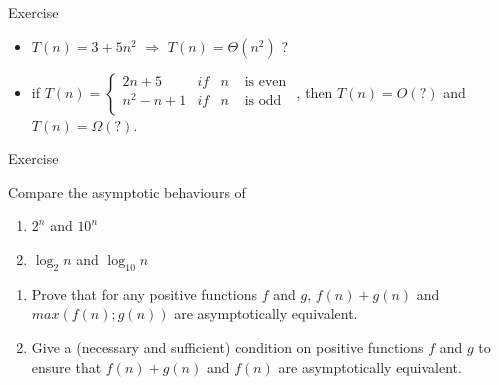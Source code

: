 \documentclass[english,10pt,table]{beamer}
\begin{document}
\begin{frame}{Exercise}
	
	\begin{block}{}\footnotesize
	 \begin{itemize}
     \item <2->\alert{$T(n) = 3 + 5n^2$} $\Rightarrow$ \alert{$T(n) = \Theta(n^2)$} ?
		 \item <3->if \alert{$T(n) = 
		    \left\{ \begin{array}{cccc} 
			    2n + 5 &  if & n & \mbox{ is even }\\
				  n^2 - n + 1 &  if & n & \mbox{ is odd }\\
								\end{array} \right.$}, then \alert{$T(n) = O(?)$} and \alert{$T(n) = \Omega(?)$}.
		\end{itemize}
 \end{block}	
\end{frame}
\begin{frame}{Exercise}
	
	\begin{block}{}
  Compare the asymptotic behaviours of 
	\begin{enumerate}
		\item \alert{$2^n$} and \alert{$10^n$}
		\item \alert{$\log_{2}n$} and \alert{$\log_{10}n$}
	\end{enumerate}	
 \end{block}

\pause

	\begin{block}{}
	\begin{enumerate}
  \item Prove that for any positive functions \alert{$f$} and \alert{$g$}, \alert{$f(n) +g(n)$} and \alert{$max(f(n); g(n))$} are asymptotically equivalent. \\
	\item Give a (necessary and sufficient) condition on positive functions \alert{$f$} and \alert{$g$} to ensure that \alert{$f(n) +g(n)$} and \alert{$f(n)$} are asymptotically equivalent. 
	\end{enumerate}
	\end{block}	
\end{frame}

\end{document}
